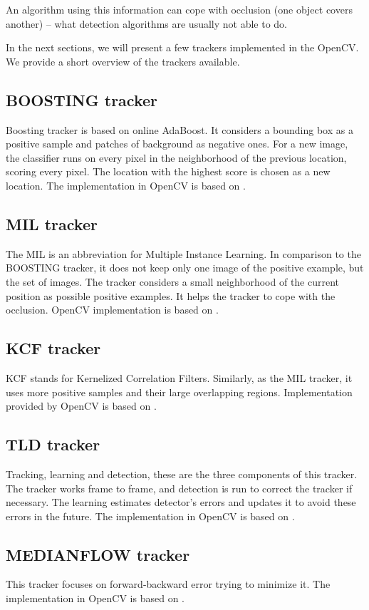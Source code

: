 An algorithm using this information can cope with occlusion (one object covers
another) -- what detection algorithms are usually not able to do.

In the next sections, we will present a few trackers implemented in the OpenCV. We
provide a short overview of the trackers available.

\subsection*{BOOSTING tracker}
Boosting tracker is based on online AdaBoost. It considers a bounding box as
a positive sample and patches of background as negative ones. For a new image, the
classifier runs on every pixel in the neighborhood of the previous location,
scoring every pixel. The location with the highest score is chosen as a new
location. The implementation in OpenCV is based on \citet*{boosting}.

\subsection*{MIL tracker}
The MIL is an abbreviation for Multiple Instance Learning. In comparison to the
BOOSTING tracker, it does not keep only one image of the positive example, but the
set of images. The tracker considers a small neighborhood of the
current position as possible positive examples. It helps the tracker to cope with
the occlusion. OpenCV implementation is based on \citet*{mil}.

\subsection*{KCF tracker}
KCF stands for Kernelized Correlation Filters. Similarly, as the MIL tracker,
it uses more positive samples and their large overlapping regions.
Implementation provided by OpenCV is based on \citet*{kcf}.

\subsection*{TLD tracker}
Tracking, learning and detection, these are the three components of this
tracker. The tracker works frame to frame, and detection is run to correct the
tracker if necessary. The learning estimates detector's errors and updates it
to avoid these errors in the future. The implementation in OpenCV is based on
\citet*{tld}.

\subsection*{MEDIANFLOW tracker}
This tracker focuses on forward-backward error trying to minimize it. The
implementation in OpenCV is based on \citet*{medianflow}.

